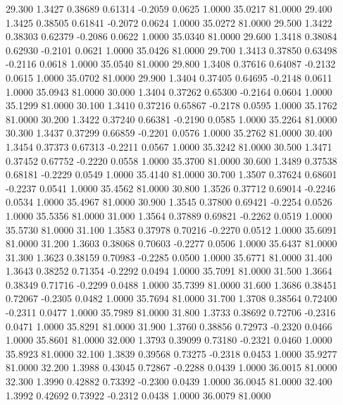   29.300   1.3427   0.38689   0.61314  -0.2059   0.0625   1.0000  35.0217  81.0000
  29.400   1.3425   0.38505   0.61841  -0.2072   0.0624   1.0000  35.0272  81.0000
  29.500   1.3422   0.38303   0.62379  -0.2086   0.0622   1.0000  35.0340  81.0000
  29.600   1.3418   0.38084   0.62930  -0.2101   0.0621   1.0000  35.0426  81.0000
  29.700   1.3413   0.37850   0.63498  -0.2116   0.0618   1.0000  35.0540  81.0000
  29.800   1.3408   0.37616   0.64087  -0.2132   0.0615   1.0000  35.0702  81.0000
  29.900   1.3404   0.37405   0.64695  -0.2148   0.0611   1.0000  35.0943  81.0000
  30.000   1.3404   0.37262   0.65300  -0.2164   0.0604   1.0000  35.1299  81.0000
  30.100   1.3410   0.37216   0.65867  -0.2178   0.0595   1.0000  35.1762  81.0000
  30.200   1.3422   0.37240   0.66381  -0.2190   0.0585   1.0000  35.2264  81.0000
  30.300   1.3437   0.37299   0.66859  -0.2201   0.0576   1.0000  35.2762  81.0000
  30.400   1.3454   0.37373   0.67313  -0.2211   0.0567   1.0000  35.3242  81.0000
  30.500   1.3471   0.37452   0.67752  -0.2220   0.0558   1.0000  35.3700  81.0000
  30.600   1.3489   0.37538   0.68181  -0.2229   0.0549   1.0000  35.4140  81.0000
  30.700   1.3507   0.37624   0.68601  -0.2237   0.0541   1.0000  35.4562  81.0000
  30.800   1.3526   0.37712   0.69014  -0.2246   0.0534   1.0000  35.4967  81.0000
  30.900   1.3545   0.37800   0.69421  -0.2254   0.0526   1.0000  35.5356  81.0000
  31.000   1.3564   0.37889   0.69821  -0.2262   0.0519   1.0000  35.5730  81.0000
  31.100   1.3583   0.37978   0.70216  -0.2270   0.0512   1.0000  35.6091  81.0000
  31.200   1.3603   0.38068   0.70603  -0.2277   0.0506   1.0000  35.6437  81.0000
  31.300   1.3623   0.38159   0.70983  -0.2285   0.0500   1.0000  35.6771  81.0000
  31.400   1.3643   0.38252   0.71354  -0.2292   0.0494   1.0000  35.7091  81.0000
  31.500   1.3664   0.38349   0.71716  -0.2299   0.0488   1.0000  35.7399  81.0000
  31.600   1.3686   0.38451   0.72067  -0.2305   0.0482   1.0000  35.7694  81.0000
  31.700   1.3708   0.38564   0.72400  -0.2311   0.0477   1.0000  35.7989  81.0000
  31.800   1.3733   0.38692   0.72706  -0.2316   0.0471   1.0000  35.8291  81.0000
  31.900   1.3760   0.38856   0.72973  -0.2320   0.0466   1.0000  35.8601  81.0000
  32.000   1.3793   0.39099   0.73180  -0.2321   0.0460   1.0000  35.8923  81.0000
  32.100   1.3839   0.39568   0.73275  -0.2318   0.0453   1.0000  35.9277  81.0000
  32.200   1.3988   0.43045   0.72867  -0.2288   0.0439   1.0000  36.0015  81.0000
  32.300   1.3990   0.42882   0.73392  -0.2300   0.0439   1.0000  36.0045  81.0000
  32.400   1.3992   0.42692   0.73922  -0.2312   0.0438   1.0000  36.0079  81.0000
